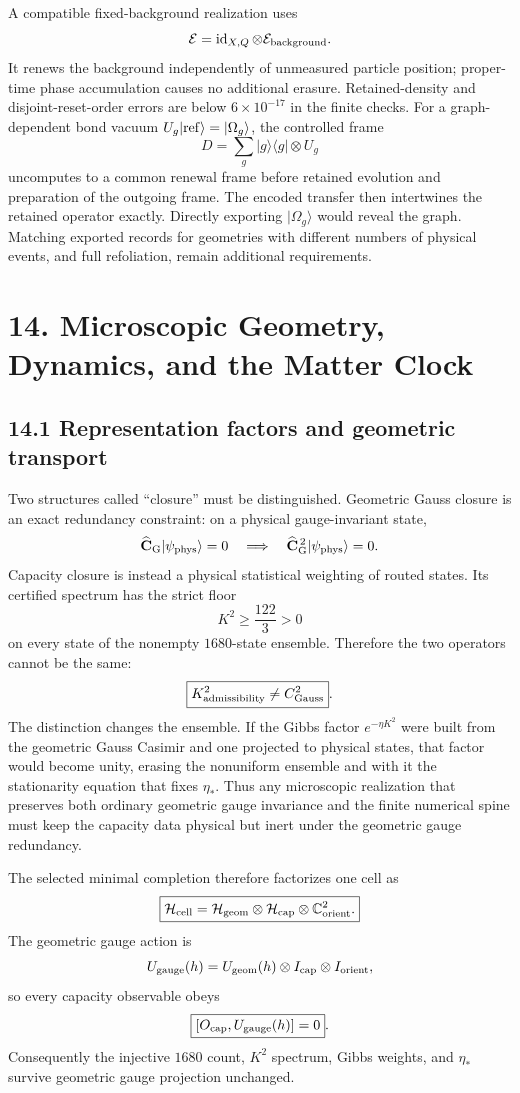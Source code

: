 \documentclass[11pt]{article}
\begin{document}
A compatible fixed-background realization uses
\[
\mathcal E=\operatorname{id}_{X,Q}\otimes\mathcal E_{\rm background}.
\]
It renews the background independently of unmeasured particle
position; proper-time phase accumulation causes no additional
erasure. Retained-density and disjoint-reset-order errors are
below \(6\times10^{-17}\) in the finite checks.
For a graph-dependent bond vacuum
\(U_g|{\rm ref}\rangle=|\Omega_g\rangle\), the controlled frame
\[
D=\sum_g|g\rangle\langle g|\otimes U_g
\]
uncomputes to a common renewal frame before retained evolution
and preparation of the outgoing frame. The encoded transfer
then intertwines the retained operator exactly.
Directly exporting \(|\Omega_g\rangle\) would reveal the graph.
Matching exported records for geometries with different
numbers of physical events, and full refoliation, remain
additional requirements.

\section{14. Microscopic Geometry, Dynamics, and the Matter Clock}

\subsection{14.1 Representation factors and geometric transport}

Two structures called ``closure'' must be distinguished. Geometric Gauss closure is an exact redundancy constraint: on a physical gauge-invariant state,
\[
\widehat{\mathbf C}_{\rm G}|\psi_{\rm phys}\rangle=0
\quad\Longrightarrow\quad
\widehat{\mathbf C}_{\rm G}^{\,2}|\psi_{\rm phys}\rangle=0.
\]
Capacity closure is instead a physical statistical weighting of routed states. Its certified spectrum has the strict floor
\[
\boxed{K^2\ge\frac{122}{3}>0}
\]
on every state of the nonempty $1680$-state ensemble. Therefore the two operators cannot be the same:
\[
\boxed{K^2_{\rm admissibility}\neq C^2_{\rm Gauss}}.
\]
The distinction changes the ensemble. If the Gibbs factor $e^{-\eta K^2}$ were built from the geometric Gauss Casimir and one projected to physical states, that factor would become unity, erasing the nonuniform ensemble and with it the stationarity equation that fixes $\eta_*$. Thus any microscopic realization that preserves both ordinary geometric gauge invariance and the finite numerical spine must keep the capacity data physical but inert under the geometric gauge redundancy.

The selected minimal completion therefore factorizes one cell as
\[
\boxed{
\mathcal H_{\rm cell}
=\mathcal H_{\rm geom}\otimes\mathcal H_{\rm cap}
\otimes\mathbb C^2_{\rm orient}.
}
\]
The geometric gauge action is
\[
U_{\rm gauge}(h)=U_{\rm geom}(h)\otimes I_{\rm cap}\otimes I_{\rm orient},
\]
so every capacity observable obeys
\[
\boxed{[O_{\rm cap},U_{\rm gauge}(h)]=0}.
\]
Consequently the injective $1680$ count, $K^2$ spectrum, Gibbs weights, and $\eta_*$ survive geometric gauge projection unchanged.
\end{document}
